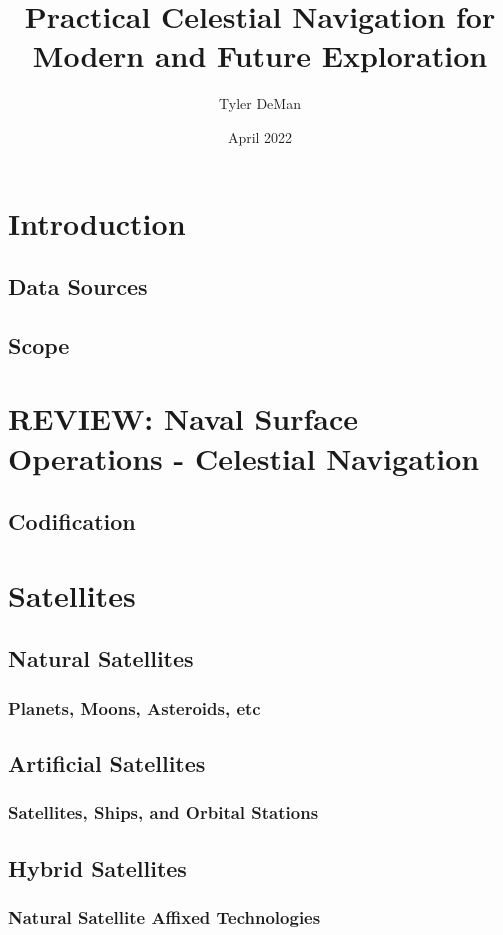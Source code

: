 \documentclass{article}
\title{Practical Celestial Navigation for Modern and Future Exploration}
\author{Tyler DeMan}
\date{April 2022}
\begin{document}
\maketitle

\section{Introduction}
    \subsection{Data Sources}
    \subsection{Scope}

\section{REVIEW: Naval Surface Operations - Celestial Navigation}
    \subsection{Codification}

\section{Satellites}
    \subsection{Natural Satellites}
        \subsubsection{Planets, Moons, Asteroids, etc}
    \subsection{Artificial Satellites}
        \subsubsection{Satellites, Ships, and Orbital Stations}
    \subsection{Hybrid Satellites}
        \subsubsection{Natural Satellite Affixed Technologies}
\end{document}
